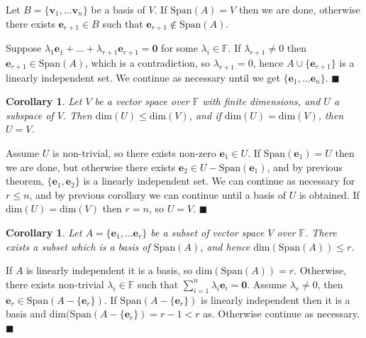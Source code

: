 \documentclass[letter-paper]{tufte-book}
\newtheorem{corollary}[theorem]{\color{pastel-blue}Corollary}
\newenvironment{proof}[1][Proof]{\begin{trivlist}
\item[\hskip \labelsep {\bfseries #1}]}{\end{trivlist}}
\newcommand{\Ob}{{\boldsymbol{0}}}
\newcommand{\eb}{{\boldsymbol{e}}}
\newcommand{\vb}{{\boldsymbol{v}}}
\newcommand{\qed}{\hfill$\blacksquare$}
\begin{document}
\begin{proof}
  Let $B = \{\vb_1, \ldots \vb_n \}$ be a basis of $V$. If $\mbox{Span}(A) = V$ then we are done, otherwise there exists $\eb_{r+1} \in B$ such that $\eb_{r+1} \not\in \mbox{Span}(A)$.
  
  Suppose $\lambda_1\eb_1 + \ldots + \lambda_{r+1}\eb_{r+1} = \Ob$ for some $\lambda_i \in \mathbb{F}$. If $\lambda_{r+1} \neq 0$ then $\eb_{r+1} \in \mbox{Span}(A)$, which is a contradiction, so $\lambda_{r+1} = 0$, hence $A \cup \{\eb_{r+1}\}$ is a linearly independent set. We continue as necessary until we get $\{\eb_1, \ldots \eb_n\}$. \qed
\end{proof}

\begin{corollary}
  Let $V$ be a vector space over $\mathbb{F}$ with finite dimensions, and $U$ a subspace of $V$. Then $\mbox{dim}(U) \leq \mbox{dim}(V)$, and if $\mbox{dim}(U) = \mbox{dim}(V)$, then $U = V$.
\end{corollary}

\begin{proof}
  Assume $U$ is non-trivial, so there exists non-zero $\eb_1 \in U$. If $\mbox{Span}(\eb_1) = U$ then we are done, but otherwise there exists $\eb_2 \in U - \mbox{Span}(\eb_1)$, and by previous theorem, $\{\eb_1, \eb_2\}$ is a linearly independent set. We can continue as necessary for $r \leq n$, and by previous corollary we can continue until a basis of $U$ is obtained. If $\mbox{dim}(U) = \mbox{dim}(V)$ then $r=n$, so $U=V$. \qed
\end{proof}

\begin{corollary}
  Let $A = \{\eb_1, \ldots \eb_r\}$ be a subset of vector space $V$ over $\mathbb{F}$. There exists a subset which is a basis of $\mbox{Span}(A)$, and hence $\mbox{dim}(\mbox{Span}(A)) \leq r$.
\end{corollary}

\begin{proof}
  If $A$ is linearly independent it is a basis, so $\mbox{dim}(\mbox{Span}(A)) = r$. Otherwise, there exists non-trivial $\lambda_i \in \mathbb{F}$ such that $\sum_{i=1}^n \lambda_i \eb_i = \Ob$. Assume $\lambda_r \neq 0$, then $\eb_r \in \mbox{Span}(A - \{\eb_r\})$. If $\mbox{Span}(A - \{\eb_r\})$ is linearly independent then it is a basis and $\mbox{dim}(\mbox{Span}(A - \{\eb_r\}) = r-1 < r$ as. Otherwise continue as necessary. \qed
\end{proof}
\end{document}
